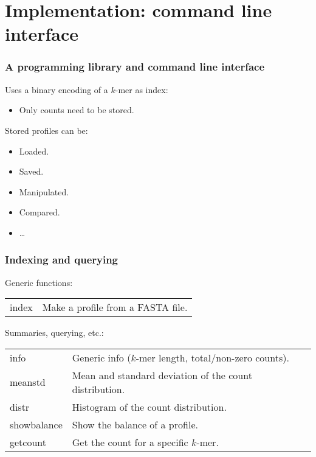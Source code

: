 \documentclass[slidestop]{beamer}
\begin{document}
\section{Implementation: command line interface}
\begin{fframe}
  \frametitle{A programming library and command line interface}

  Uses a binary encoding of a $k$-mer as index:
  \begin{itemize}
    \item Only counts need to be stored.
  \end{itemize}
  \bigskip
  \pause

  Stored profiles can be:
  \begin{itemize}
    \item Loaded.
    \item Saved.
    \item Manipulated.
    \item Compared.
    \item \ldots
  \end{itemize}

  \vfill
  {
  }
\end{fframe}

\begin{frame}
  \frametitle{Indexing and querying}

  Generic functions:
  \begin{tabular}{@{\fakeitem}p{3cm}p{7cm}}
    index       & Make a profile from a FASTA file.\\
  \end{tabular}
  \bigskip
  \pause

  Summaries, querying, etc.:
  \begin{tabular}{@{\fakeitem}p{3cm}p{7cm}}
    info        & Generic info ($k$-mer length, total/non-zero counts).\\
    meanstd     & Mean and standard deviation of the count distribution.\\
    distr       & Histogram of the count distribution.\\
    showbalance & Show the balance of a profile.\\
    getcount    & Get the count for a specific $k$-mer.\\
  \end{tabular}
\end{frame}
\end{document}
